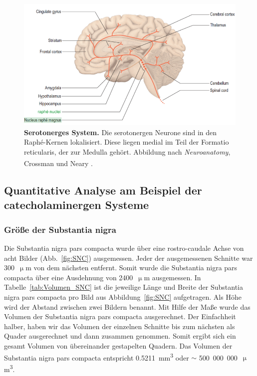 \documentclass[12pt,a4paper,pdftex]{article}
\begin{document}
\begin{figure}[H]
    \centering
    \includegraphics[width=\textwidth]{pictures/Bilder_monoamine_systeme/serotonerges_system.PNG}
    \caption[Serotonerges System]{\textbf{Serotonerges System.} Die serotonergen Neurone sind in den Raphé-Kernen lokalisiert. Diese liegen medial im Teil der Formatio reticularis, der zur Medulla gehört. Abbildung nach \textit{Neuroanatomy}, Crossman und Neary \textsuperscript{\cite[9]{crossman2014neuroanatomy}}.}
    \label{fig:serotonerges_system}
\end{figure}{}


\subsection{Quantitative Analyse am Beispiel der catecholaminergen Systeme}
\label{sec:immu}

\subsubsection{Größe der Substantia nigra}

Die Substantia nigra pars compacta  wurde über eine rostro-caudale Achse von acht Bilder (Abb.~\ref{fig:SNC}) ausgemessen. Jeder der ausgemessenen Schnitte war 300~$\upmu$m von dem nächsten entfernt. Somit wurde die Substantia nigra pars compacta über eine Ausdehnung von 2400~$\upmu$m ausgemessen. In Tabelle~\ref{tab:Volumen_SNC} ist die jeweilige Länge und Breite der Substantia nigra pars compacta pro Bild aus Abbildung~\ref{fig:SNC} aufgetragen. Als Höhe wird der Abstand zwischen zwei Bildern benannt. Mit Hilfe der Maße wurde das Volumen der Substantia nigra pars compacta ausgerechnet. Der Einfachheit halber, haben wir das Volumen der einzelnen Schnitte bis zum nächsten als Quader ausgerechnet und dann zusammen genommen. Somit ergibt sich ein gesamt Volumen von übereinander gestapelten Quadern. Das Volumen der Substantia nigra pars compacta entspricht 0.5211~mm\textsuperscript{3} oder $\sim$ 500~000~000~$\upmu$m\textsuperscript{3}.
\end{document}
